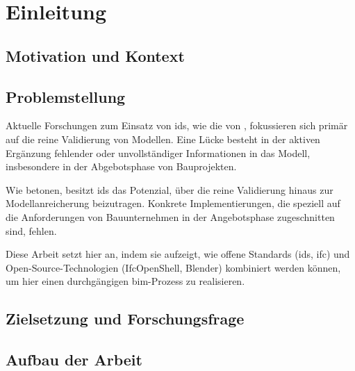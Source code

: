 \section{Einleitung}
\subsection{Motivation und Kontext}
\subsection{Problemstellung}




Aktuelle Forschungen zum Einsatz von \gls{ids}, wie die von \cite{kladz2025ids}, 
fokussieren sich primär auf die reine Validierung von Modellen. 
Eine Lücke besteht in der aktiven Ergänzung fehlender oder 
unvollständiger Informationen in das Modell, insbesondere in der Abgebotsphase von Bauprojekten.
 
Wie \cite{de2024enriching} betonen, besitzt \gls{ids} das Potenzial, über die reine Validierung hinaus 
zur Modellanreicherung beizutragen. Konkrete Implementierungen, die speziell auf die Anforderungen von 
Bauunternehmen in der Angebotsphase zugeschnitten sind, fehlen.

Diese Arbeit setzt hier an, indem sie aufzeigt, wie offene Standards (\gls{ids}, \gls{ifc}) 
und Open-Source-Technologien (IfcOpenShell, Blender) kombiniert werden können, um hier einen 
durchgängigen \gls{bim}-Prozess zu realisieren.


\subsection{Zielsetzung und Forschungsfrage}
\subsection{Aufbau der Arbeit}